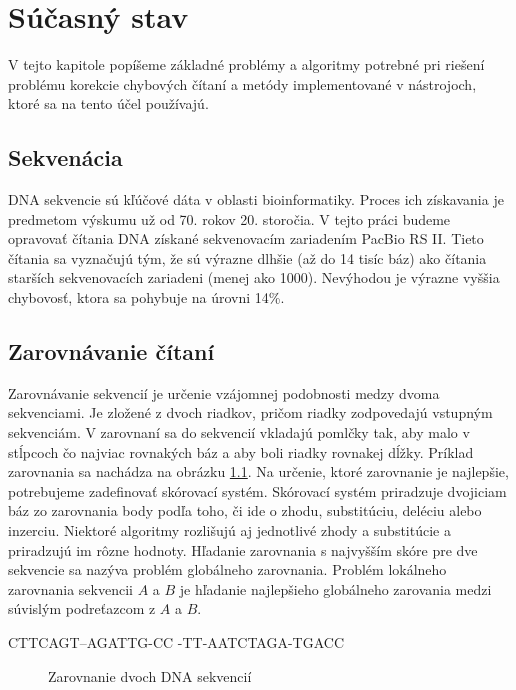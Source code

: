 \chapter{Súčasný stav}

V tejto kapitole popíšeme základné problémy a algoritmy potrebné pri riešení problému korekcie chybových čítaní a metódy implementované v nástrojoch, ktoré sa na tento účel používajú.

\section{Sekvenácia}

DNA sekvencie sú kľúčové dáta v oblasti bioinformatiky. Proces ich získavania je predmetom výskumu už od 70. rokov 20. storočia. V tejto práci budeme opravovať čítania DNA získané sekvenovacím zariadením PacBio RS II. Tieto čítania sa vyznačujú tým, že sú výrazne dlhšie (až do 14 tisíc báz) ako čítania starších sekvenovacích zariadeni (menej ako 1000). Nevýhodou je výrazne vyššia chybovosť, ktora sa pohybuje na úrovni 14\%.

\section{Zarovnávanie čítaní}

Zarovnávanie sekvencií je určenie vzájomnej podobnosti medzy dvoma sekvenciami. Je zložené z dvoch riadkov, pričom riadky zodpovedajú vstup\-ným sekvenciám. V zarovnaní sa do sekvencií vkladajú pomlčky tak, aby malo v stĺpcoch čo najviac rovnakých báz a aby boli riadky rovnakej dĺžky. Príklad zarovnania sa nachádza na obrázku \ref{fig:priklad_zarovnanie}. Na určenie, ktoré zarovnanie je najlepšie, potrebujeme zadefinovať skórovací systém. Skórovací systém priradzuje dvojiciam báz zo zarovnania body podľa toho, či ide o zhodu, substitúciu, deléciu alebo inzerciu. Niektoré algoritmy rozlišujú aj jednotlivé zhody a substitúcie a priradzujú im rôzne hodnoty. Hľadanie zarovnania s najvyšším skóre pre dve sekvencie sa nazýva problém globálneho zarovnania. Problém lokálneho zarovnania sekvencii $A$ a $B$ je hľadanie najlepšieho globálneho zarovania medzi súvislým podreťazcom z $A$ a $B$.

\begin{verbbox}
    CTTCAGT--AGATTG-CC
    -TT-AATCTAGA-TGACC
\end{verbbox}
    
\begin{figure}
    \centering
    \theverbbox
    \caption{Zarovnanie dvoch DNA sekvencií}
    \label{fig:priklad_zarovnanie}
\end{figure}

